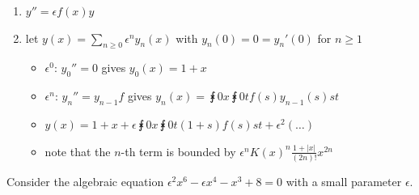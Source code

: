 \documentclass[english, parskip=full]{scrbook}
\newcommand{\example}[3]{\begin{tcolorbox}[colback=colorbackgroundexample,colframe=colorexample, breakable,enhanced,title={\textbf{#1}: #2.}]#3\end{tcolorbox}}
\begin{document}
\example{ODE}{$y'' = f(x)y$ with $y(0)=1$ and $y'(0)=1$}{\begin{enumerate}
\item $y''=\epsilon f(x)y$
\item let $y(x) = \sum_{n\ge 0} \epsilon^n y_n(x)$ with $y_n(0)=0=y_n'(0)$ for $n\ge 1$
\begin{itemize}
\item $\epsilon^0$: $y_0''=0$ gives $y_0(x)=1+x$
\item $\epsilon^n$: $y_n''=y_{n-1} f$ gives $y_n(x) = \intx{0}{x}{\intx{0}{t}{f(s)y_{n-1}(s)}{s}}{t}$
\item $y(x) = 1 + x + \epsilon\intx{0}{x}{\intx{0}{t}{(1+s)f(s)}{s}}{t} + \epsilon^2 (\dots)$
\item note that the $n$-th term is bounded by $\epsilon^n K(x)^n \frac{1+|x|}{(2n)!} x^{2n}$
\end{itemize}
\end{enumerate}}

Consider the algebraic equation $\epsilon^2 x^6 - \epsilon x^4 - x^3 + 8 = 0$ with a small parameter $\epsilon$.
\end{document}
